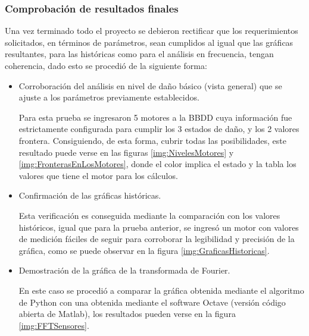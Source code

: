 \subsubsection{Comprobación de resultados finales}
Una vez terminado todo el proyecto se debieron rectificar que los requerimientos
solicitados, en términos de parámetros, sean cumplidos al igual que las gráficas
resultantes, para las históricas como para el análisis en frecuencia, tengan
coherencia, dado esto se procedió de la siguiente forma:

\begin{itemize}
    \item Corroboración del análisis en nivel de daño básico (vista general)
        que se ajuste a los parámetros previamente establecidos.

        Para esta prueba se ingresaron 5 motores a la BBDD cuya información fue
        estrictamente configurada para cumplir los 3 estados de daño, y los
        2 valores frontera. Consiguiendo, de esta forma, cubrir todas las
        posibilidades, este resultado puede verse en las figuras
        \ref{img:NivelesMotores}
        y
        \ref{img:FronterasEnLosMotores},     donde el color
        implica el estado y la tabla los valores que tiene el motor
        para los cálculos.


\item Confirmación de las gráficas históricas.

        Esta verificación es conseguida mediante la comparación con los valores
        históricos, igual que para la prueba anterior, se ingresó un motor
        con valores de medición fáciles de seguir para corroborar la legibilidad
        y precisión de la gráfica, como se puede observar en la figura \ref{img:GraficasHistoricas}.

    \item Demostración de la gráfica de la transformada de Fourier.

        En este caso se procedió a comparar la gráfica obtenida mediante el
        algoritmo de Python con una obtenida mediante el software Octave (versión
        código abierta de Matlab), los resultados pueden verse en la figura
        \ref{img:FFTSensores}.
\end{itemize}







